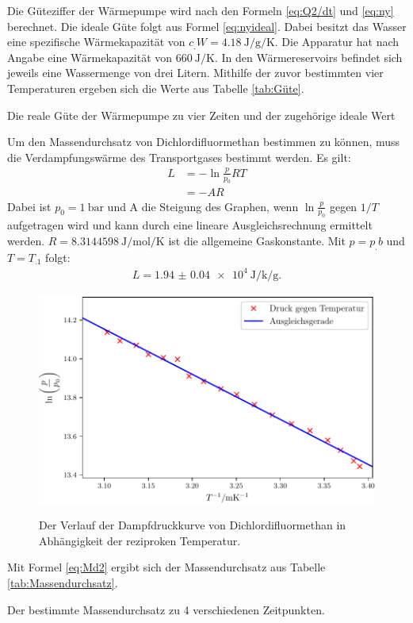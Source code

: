 Die Güteziffer der Wärmepumpe wird nach den Formeln \eqref{eq:Q2/dt} und \eqref{eq:ny} berechnet. Die ideale Güte folgt aus Formel \eqref{eq:nyideal}. 
Dabei besitzt das Wasser eine spezifische Wärmekapazität von $c_.W=\SI{4.18}{\joule\per\gram\per\kelvin}$\cite{V201}. Die Apparatur hat nach Angabe eine Wärmekapazität von $\SI{660}{\joule\per\kelvin}$. In den Wärmereservoirs befindet sich jeweils eine Wassermenge von drei Litern. Mithilfe der zuvor bestimmten vier Temperaturen ergeben sich die Werte aus Tabelle \ref{tab:Güte}. 
\begin{table}
	\centering
	\caption{Die reale Güte der Wärmepumpe zu vier Zeiten und der zugehörige ideale Wert}
 	\label{tab:Güte}
\end{table}
\newline
\noindent Um den Massendurchsatz von Dichlordifluormethan bestimmen zu können, muss die Verdampfungswärme des Transportgases bestimmt werden. Es gilt:
\begin{align*}
 	 L &= -\ln{\frac{p}{p_0}} RT\\
	    &= - A R
\end{align*}
Dabei ist $p_0 = \SI{1}{\bar}$ und A die Steigung des Graphen, wenn $\ln{\frac{p}{p_0}}$ gegen $1/T$ aufgetragen wird und kann durch eine lineare Ausgleichsrechnung ermittelt werden. $R = \SI{8.3144598}{\joule\per\mol\per\kelvin}$ \cite{R} ist die allgemeine Gaskonstante.
Mit $p=p_.b$ und $T=T_.1$ folgt:
\begin{align*}
 	 L = \SI{1.94(4)e+4}{\joule\per\kilo\per\gram}\text{.}
\end{align*}
\begin{figure}
 	\centering
 	\caption{Der Verlauf der Dampfdruckkurve von Dichlordifluormethan in Abhängigkeit der reziproken Temperatur.}
 	\includegraphics[width=\linewidth-70pt,height=\textheight-70pt,keepaspectratio]{content/images/Dampfdruck.pdf}
 	\label{fig:Dampfdruck}
\end{figure}
\newline
\noindent Mit Formel \eqref{eq:Md2} ergibt sich der Massendurchsatz aus Tabelle \ref{tab:Massendurchsatz}.
 \begin{table}
   	\centering
   	\caption{Der bestimmte Massendurchsatz zu 4 verschiedenen Zeitpunkten.}
   	\label{tab:Massendurchsatz}
 \end{table}

